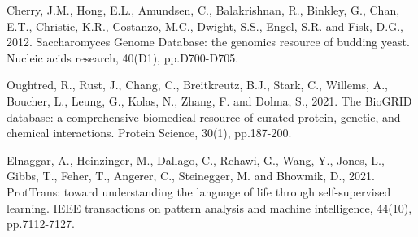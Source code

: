 \documentclass[12pt,a4paper]{article}
\begin{document}
\begin{thebibliography}{00}
 Cherry, J.M., Hong, E.L., Amundsen, C., Balakrishnan, R., Binkley, G., Chan, E.T., Christie, K.R., Costanzo, M.C., Dwight, S.S., Engel, S.R. and Fisk, D.G., 2012. Saccharomyces Genome Database: the genomics resource of budding yeast. Nucleic acids research, 40(D1), pp.D700-D705.

 Oughtred, R., Rust, J., Chang, C., Breitkreutz, B.J., Stark, C., Willems, A., Boucher, L., Leung, G., Kolas, N., Zhang, F. and Dolma, S., 2021. The BioGRID database: a comprehensive biomedical resource of curated protein, genetic, and chemical interactions. Protein Science, 30(1), pp.187-200.

 Elnaggar, A., Heinzinger, M., Dallago, C., Rehawi, G., Wang, Y., Jones, L., Gibbs, T., Feher, T., Angerer, C., Steinegger, M. and Bhowmik, D., 2021. ProtTrans: toward understanding the language of life through self-supervised learning. IEEE transactions on pattern analysis and machine intelligence, 44(10), pp.7112-7127.

\end{thebibliography}
\end{document}
